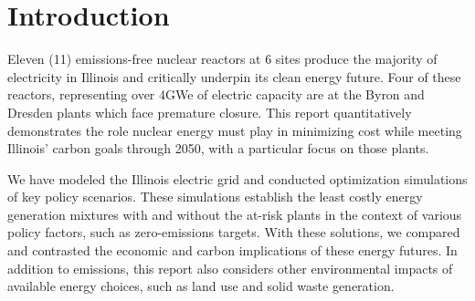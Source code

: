 \section{Introduction}
Eleven (11) emissions-free nuclear reactors at 6 sites produce the majority of
electricity in Illinois and critically underpin its clean energy future. Four 
of these reactors, representing over 4GWe of electric capacity are at the Byron 
and Dresden plants which face premature closure. This
report quantitatively demonstrates the role nuclear energy must play in
minimizing cost while meeting Illinois’ carbon goals through 2050, with a 
particular focus on those plants. 

We have 
modeled the Illinois electric grid and conducted optimization simulations of 
key policy scenarios. These simulations establish the least costly energy 
generation mixtures with and without the at-risk plants in the context of 
various policy factors, such as zero-emissions targets. With these solutions, we 
compared and contrasted the economic and carbon implications of
these energy futures. In addition to emissions, this report also considers
other environmental impacts of available energy choices, such as land use and
solid waste generation.

